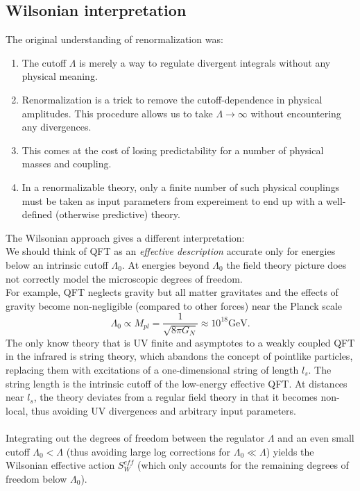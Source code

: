 \subsection{Wilsonian interpretation}
The original understanding of renormalization was:
\begin{enumerate}
	\item The cutoff $\Lambda$ is merely a way to regulate divergent integrals without any physical meaning.
	\item Renormalization is a trick to remove the cutoff-dependence in physical amplitudes. This procedure allows us to take $\Lambda \rightarrow \infty$ without encountering any divergences.
	\item This comes at the cost of losing predictability for a number of physical masses and coupling.
	\item In a renormalizable theory, only a finite number of such physical couplings must be taken as input parameters from expereiment to end up with a well-defined (otherwise predictive) theory.
\end{enumerate}
The Wilsonian approach gives a different interpretation:\\
We should think of QFT as an \emph{effective description} accurate only for energies below an intrinsic cutoff $\Lambda_0$. At energies beyond $\Lambda_0$ the field theory picture does not correctly model the microscopic degrees of freedom.\\
For example, QFT neglects gravity but all matter gravitates and the effects of gravity become non-negligible (compared to other forces) near the Planck scale
\begin{equation}
	\Lambda_0 \propto M_{pl} = \frac{1}{\sqrt{8  \pi G_N}} \approx 10^{18} \mathrm{GeV}.
\end{equation}
The only know theory that is UV finite and asymptotes to a weakly coupled QFT in the infrared is string theory, which abandons the concept of pointlike particles, replacing them with excitations of a one-dimensional string of length $l_s$. The string length is the intrinsic cutoff of the low-energy effective QFT. At distances near $l_s$, the theory deviates from a regular field theory in that it becomes non-local, thus avoiding UV divergences and arbitrary input parameters.\\
\\
Integrating out the degrees of freedom between the regulator $\Lambda$ and an even small cutoff $\Lambda_0 < \Lambda$ (thus avoiding large log corrections for $\Lambda_0 \ll \Lambda$) yields the Wilsonian effective action $S^{eff}_W$ (which only accounts for the remaining degrees of freedom below $\Lambda_0$).\\
